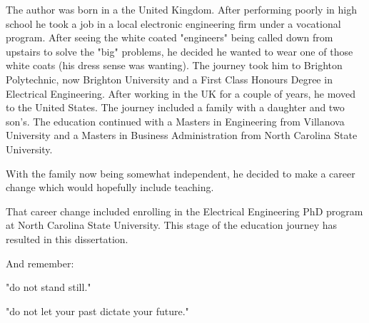 \begin{biography}
The author was born in a the United Kingdom.  After performing poorly in high school he took a job in a local electronic engineering firm
under a vocational program.
After seeing the white coated "engineers" being called down from upstairs to solve the "big" problems, he decided he wanted to wear one
of those white coats (his dress sense was wanting).
The journey took him to Brighton Polytechnic, now Brighton University and a First Class Honours Degree in Electrical Engineering.
After working in the UK for a couple of years, he moved to the United States.
The journey included a family with a daughter and two son's.
The education continued with a Masters in Engineering from Villanova University and a Masters in Business Administration from North
Carolina State University.

With the family now being somewhat independent, he decided to make a career change which would hopefully include teaching.

That career change included enrolling in the Electrical Engineering PhD program at North
Carolina State University. This stage of the education journey has resulted in this dissertation.




And remember:

"do not stand still."  

"do not let your past dictate your future."


\end{biography}

